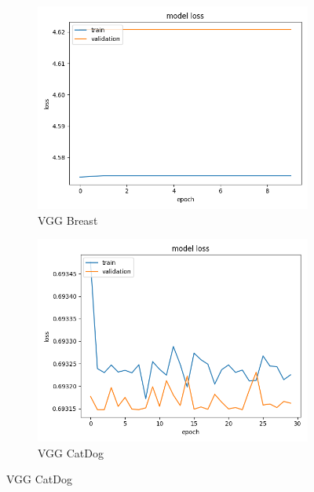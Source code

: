 \begin{figure}[h]
\begin{subfigure}[b]{.45\linewidth}
\includegraphics[width=\linewidth]{Figs/vgg_breast_loss.jpg}
\caption{VGG Breast}
\end{subfigure}
\begin{subfigure}[b]{.45\linewidth}
\includegraphics[width=\linewidth]{Figs/vgg_catdog_loss.jpg}
\caption{VGG CatDog}
\end{subfigure}


\end{figure}
